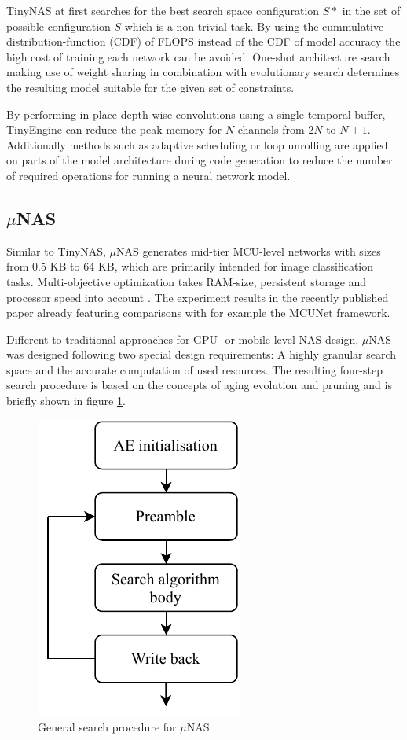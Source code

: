 \documentclass[10pt,        %
               a4paper,     %
               journal,     %
               ]{IEEEtran}
\begin{document}
TinyNAS at first searches for the best search space configuration $S*$ in the set of possible configuration $S$ which is a non-trivial task. By using the cummulative-distribution-function (CDF) of FLOPS instead of the CDF of model accuracy the high cost of training each network can be avoided. One-shot architecture search making use of weight sharing in combination with evolutionary search determines the resulting model suitable for the given set of constraints.

By performing in-place depth-wise convolutions using a single temporal buffer, TinyEngine can reduce the peak memory for $N$ channels from $2N$ to $N+1$. Additionally methods such as adaptive scheduling or loop unrolling are applied on parts of the model architecture during code generation to reduce the number of required operations for running a neural network model. \cite{mcunet2020}


\subsection{$\mu$NAS}

Similar to TinyNAS, $\mu$NAS generates mid-tier MCU-level networks with sizes from 0.5 KB to 64 KB, which are primarily intended for image classification tasks. Multi-objective optimization takes RAM-size, persistent storage and processor speed into account \cite{unas2020}. The experiment results in the recently published paper already featuring comparisons with for example the MCUNet framework.

Different to traditional approaches for GPU- or mobile-level NAS design, $\mu$NAS was designed following two special design requirements: A highly granular search space and the accurate computation of used resources. The resulting four-step search procedure is based on the concepts of aging evolution and pruning and is briefly shown in figure \ref{fig:unas}.

\begin{figure}
    \centering
    \includegraphics[scale=0.75]{paper/figures/unas.pdf}
    \caption{General search procedure for $\mu$NAS \cite{unas2020}}
    \label{fig:unas}
\end{figure}
\end{document}
